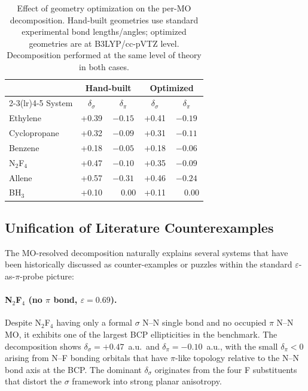 \documentclass[twoside,natbib]{svjour3}
\newcommand{\delsg}{\delta_{\sigma}}
\newcommand{\delpi}{\delta_{\pi}}
\newcommand{\eps}{\varepsilon}
\begin{document}
\begin{table}[t]
\centering
\caption{Effect of geometry optimization on the per-MO decomposition.
Hand-built geometries use standard experimental bond lengths/angles;
optimized geometries are at B3LYP/cc-pVTZ level. Decomposition
performed at the same level of theory in both cases.}
\label{tab:geometry}
\begin{tabular}{lcccc}
\toprule
& \multicolumn{2}{c}{Hand-built} & \multicolumn{2}{c}{Optimized} \\
\cmidrule(lr){2-3}\cmidrule(lr){4-5}
System & $\delsg$ & $\delpi$ & $\delsg$ & $\delpi$ \\
\midrule
Ethylene       & +0.39 & $-0.15$ & +0.41 & $-0.19$ \\
Cyclopropane   & +0.32 & $-0.09$ & +0.31 & $-0.11$ \\
Benzene        & +0.18 & $-0.05$ & +0.18 & $-0.06$ \\
N$_2$F$_4$     & +0.47 & $-0.10$ & +0.35 & $-0.09$ \\
Allene         & +0.57 & $-0.31$ & +0.46 & $-0.24$ \\
BH$_3$         & +0.10 & $\phantom{-}0.00$ & +0.11 & $\phantom{-}0.00$ \\
\bottomrule
\end{tabular}
\end{table}

\subsection{Unification of Literature Counterexamples}
\label{sec:results_counter}

The MO-resolved decomposition naturally explains several systems
that have been historically discussed as counter-examples or
puzzles within the standard $\eps$-as-$\pi$-probe picture:

\paragraph{N$_2$F$_4$ (no $\pi$ bond, $\eps = 0.69$).}
Despite N$_2$F$_4$ having only a formal $\sigma$ N--N single bond
and no occupied $\pi$ N--N MO, it exhibits one of the largest BCP
ellipticities in the benchmark. The decomposition shows
$\delsg = +0.47$~a.u.\ and $\delpi = -0.10$~a.u., with the small
$\delpi < 0$ arising from N--F bonding orbitals that have $\pi$-like
topology relative to the N--N bond axis at the BCP. The dominant
$\delsg$ originates from the four F substituents that distort the
$\sigma$ framework into strong planar anisotropy.
\end{document}
